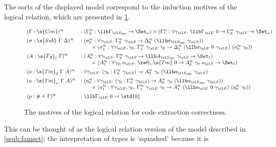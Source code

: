 \documentclass[a4paper,UKenglish,cleveref,autoref,thm-restate]{lipics-v2021}
\begin{document}
The sorts of the displayed model correspond to the induction
motives of the logical relation, which are presented in \cref{fig:logrel}.
\begin{figure}[h]
{$$\begin{array}{ll}
  (\Gamma : \s{Con})^{\approx} &:
    (\Gamma^{\approx}_0 : \llb\Gamma_{\cl S_\Set} \to \Set_{\omega}) \times (\Gamma^{\approx}_1 : \forall \gamma_{\cl S}.\ \llb\Gamma_{\cl E}\ 0
    \to \Gamma^{\approx}_0\ \gamma_{\cl S} \to \Set_{\omega}) \\[0.5em]
  (\sigma : \s{Sub}\ \Gamma\ \Delta)^{\approx} &:
    (\sigma^{\approx}_0 : \forall \gamma_{\cl S}.\ \Gamma^{\approx}_0\ \gamma_{\cl S} \to \Delta^{\approx}_0\ (\llb\sigma_{\cl S_\Set}\ \gamma_{\cl S})) \\
    &\qquad \times\ (\sigma^{\approx}_1 : \forall \gamma_{\cl E},\gamma_0.\ \Gamma^{\approx}_1\ \gamma_{\cl E}\ \gamma_0
    \to \Delta^{\approx}_1\ (\llb\sigma_{\cl E}\ 0\ \gamma_{\cl E})\ (\sigma^{\approx}_0\ \gamma_0)) \\[0.5em]
  (A : \s{Ty}_\ell\ \Gamma)^{\approx} &:
    (A^{\approx}_0 : \forall \gamma_{\cl S}.\ \Gamma^{\approx}_0\ \gamma_{\cl S} \to \llb A_{\cl S_\Set}\ \gamma_{\cl S} \to \Set_{\ell}) \\
    &\qquad \times\ (A^{\approx}_1 : \forall \gamma_0,a_{\cl S}.\ \re 0_\lambda.\s{Tm}\ {0}
    \to A^{\approx}_0\ \gamma_0\ a_{\cl S} \to \Set_{\ell}) \\[0.5em]
  (a : \s{Tm}_0\ \Gamma\ A)^{\approx} &:
    \forall \gamma_{\cl S}.\ (\gamma_0 : \Gamma^{\approx}_0\ \gamma_{\cl S}) \to A^{\approx}_0\ \gamma_0\ (\llb a_{\cl S_\Set}\ \gamma_{\cl S}) \\[0.5em]
  (a : \s{Tm}_\omega\ \Gamma\ A)^{\approx} &:
    (a^{\approx}_0 : \forall \gamma_{\cl S}.\ (\gamma_0 : \Gamma^{\approx}_0\ \gamma_{\cl S}) \to A^{\approx}_0\ \gamma_0\ (\llb a_{\cl S_\Set}\ \gamma_{\cl S})) \\
    &\qquad \times\ (a^{\approx}_1 : \forall \gamma_{\cl E},\gamma_0.\ \Gamma^{\approx}_1\ \gamma_{\cl E}\ \gamma_0
    \to A^{\approx}_1\ (\llb a_{\cl E}\ 0\ \gamma_{\cl E})\ (a^{\approx}_0\ \gamma_0)) \\[0.5em]
  (p : \#\in \Gamma)^{\approx} &: \llb\Gamma_{\cl E}\ 0 \to \std{0}
\end{array}$$}
\caption{The motives of the logical relation for code extraction correctness.}
\label{fig:logrel}
\end{figure}
This can be thought of as the logical relation version of the model described in
\cref{ssub:famset}; the interpretation of types is `squashed' because it is
\end{document}
